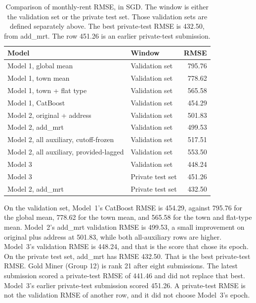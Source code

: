 \documentclass[11pt,a4paper]{article}
\begin{document}
\begin{table}[htbp]
\centering
\caption{Comparison of monthly-rent RMSE, in SGD.
The window is either the validation set or the private test set.
Those validation sets are defined separately above.
The best private-test RMSE is 432.50, from add\_mrt.
The row 451.26 is an earlier private-test submission.}
\label{tab:headline}
\small
\setlength{\tabcolsep}{3pt}
\begin{tabularx}{\textwidth}{@{}>{\raggedright\arraybackslash}p{} X r@{}}
\toprule
Model & Window & RMSE \\
\midrule
Model 1, global mean & Validation set & 795.76 \\
Model 1, town mean & Validation set & 778.62 \\
Model 1, town + flat type & Validation set & 565.58 \\
Model 1, CatBoost & Validation set & 454.29 \\
Model 2, original + address & Validation set & 501.83 \\
Model 2, add\_mrt & Validation set & 499.53 \\
Model 2, all auxiliary, cutoff-frozen & Validation set & 517.51 \\
Model 2, all auxiliary, provided-lagged & Validation set & 553.50 \\
Model 3 & Validation set & 448.24 \\
Model 3 & Private test set & 451.26 \\
Model 2, add\_mrt & Private test set & 432.50 \\
\bottomrule
\end{tabularx}
\end{table}

On the validation set, Model~1's CatBoost RMSE is 454.29, against 795.76 for the global mean, 778.62 for the town mean, and 565.58 for the town and flat-type mean.
Model~2's add\_mrt validation RMSE is 499.53, a small improvement on original plus address at 501.83, while both all-auxiliary rows are higher.
Model~3's validation RMSE is 448.24, and that is the score that chose its epoch.
On the private test set, add\_mrt has RMSE 432.50.
That is the best private-test RMSE.
Gold Miner (Group 12) is rank 21 after eight submissions.
The latest submission scored a private-test RMSE of 441.46 and did not replace that best.
Model~3's earlier private-test submission scored 451.26.
A private-test RMSE is not the validation RMSE of another row, and it did not choose Model~3's epoch.
\end{document}
